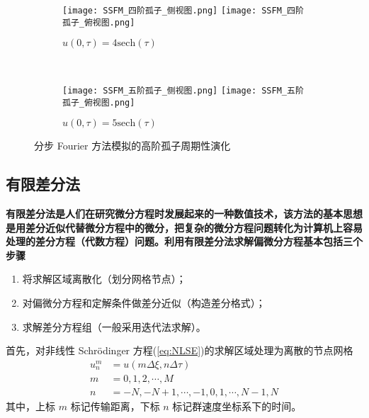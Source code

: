 \begin{figure}[tbp]
    \centering
    \begin{subfigure}[t]{0.85\linewidth}
        \captionsetup{justification=centering} 
        \begin{minipage}[b]{1\linewidth}
        \texttt{[image: SSFM\_四阶孤子\_侧视图.png]}
        \texttt{[image: SSFM\_四阶孤子\_俯视图.png]}
        \caption{$u(0,\tau)=4\mathrm{sech}(\tau)$}
        \end{minipage}
    \end{subfigure}\\
    \begin{subfigure}[t]{0.85\linewidth}
        \captionsetup{justification=centering} 
        \begin{minipage}[b]{1\linewidth}
        \texttt{[image: SSFM\_五阶孤子\_侧视图.png]}
        \texttt{[image: SSFM\_五阶孤子\_俯视图.png]}
        \caption{$u(0,\tau)=5\mathrm{sech}(\tau)$}
        \end{minipage}
    \end{subfigure}
    \caption{分步 Fourier 方法模拟的高阶孤子周期性演化}
    \label{fig:split-step Fourier method}
\end{figure}

\subsection{有限差分法}
{\bfseries 有限差分法是人们在研究微分方程时发展起来的一种数值技术，该方法的基本思想是用差分近似代替微分方程中的微分，把复杂的微分方程问题转化为计算机上容易处理的差分方程（代数方程）问题。利用有限差分法求解偏微分方程基本包括三个步骤\cite{yangbojun}
\begin{enumerate}[label=(\arabic*)]
    \item 将求解区域离散化（划分网格节点）；
    \item 对偏微分方程和定解条件做差分近似（构造差分格式）；
    \item 求解差分方程组（一般采用迭代法求解）。
\end{enumerate}}

首先，对非线性 Schr\"odinger 方程(\ref{eq:NLSE})的求解区域处理为离散的节点网格
\begin{align}
    u_{n}^{m}&=u(m\Delta\xi,n\Delta\tau)\\
    m&=0,1,2,\cdots,M \nonumber \\
    n&=-N,-N+1,\cdots,-1,0,1,\cdots,N-1,N \nonumber    
\end{align}
其中，上标 $m$ 标记传输距离，下标 $n$ 标记群速度坐标系下的时间。

